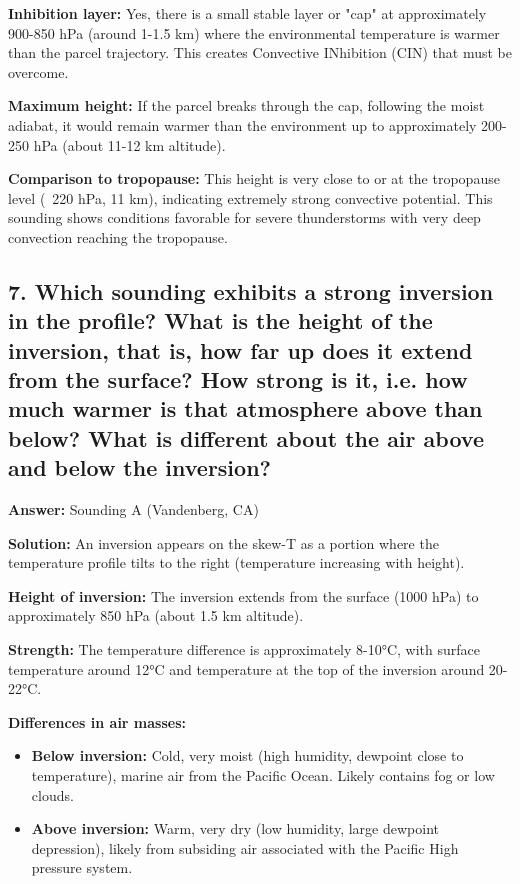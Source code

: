 \documentclass[letterpaper, 11pt]{article}
\newcommand{\1}{\mathds{1}}	%
\theoremstyle{definition}
\begin{document}
\textbf{Inhibition layer:} Yes, there is a small stable layer or "cap" at approximately 900-850 hPa (around 1-1.5 km) where the environmental temperature is warmer than the parcel trajectory. This creates Convective INhibition (CIN) that must be overcome.

\textbf{Maximum height:} If the parcel breaks through the cap, following the moist adiabat, it would remain warmer than the environment up to approximately 200-250 hPa (about 11-12 km altitude).

\textbf{Comparison to tropopause:} This height is very close to or at the tropopause level (~220 hPa, 11 km), indicating extremely strong convective potential. This sounding shows conditions favorable for severe thunderstorms with very deep convection reaching the tropopause.

\subsection*{7. Which sounding exhibits a strong inversion in the profile? What is the height of the inversion, that is, how far up does it extend from the surface? How strong is it, i.e. how much warmer is that atmosphere above than below? What is different about the air above and below the inversion?}

\textbf{Answer:} Sounding A (Vandenberg, CA)

\textbf{Solution:} An inversion appears on the skew-T as a portion where the temperature profile tilts to the right (temperature increasing with height).

\textbf{Height of inversion:} The inversion extends from the surface (1000 hPa) to approximately 850 hPa (about 1.5 km altitude).

\textbf{Strength:} The temperature difference is approximately 8-10°C, with surface temperature around 12°C and temperature at the top of the inversion around 20-22°C.

\textbf{Differences in air masses:}
\begin{itemize}
    \item \textbf{Below inversion:} Cold, very moist (high humidity, dewpoint close to temperature), marine air from the Pacific Ocean. Likely contains fog or low clouds.
    \item \textbf{Above inversion:} Warm, very dry (low humidity, large dewpoint depression), likely from subsiding air associated with the Pacific High pressure system.
\end{itemize}
\end{document}
